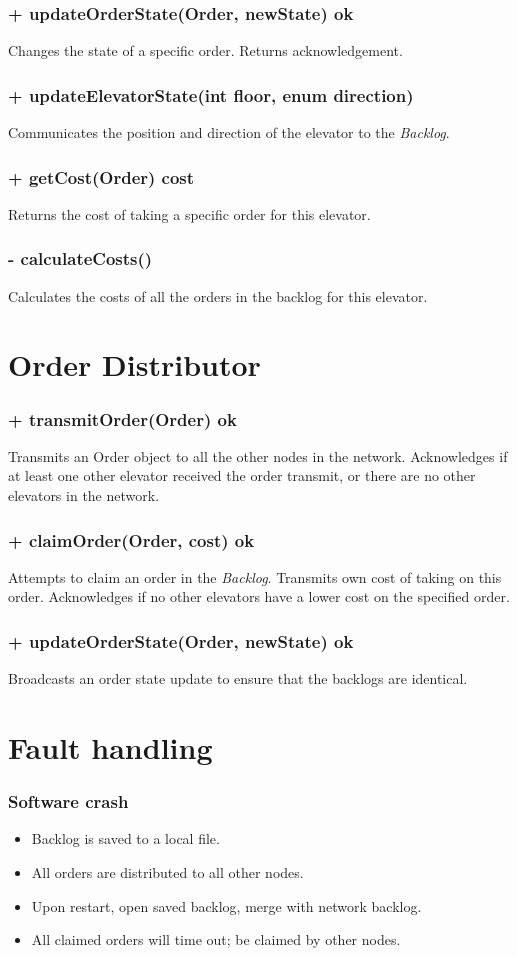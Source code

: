\documentclass[11pt,a4paper]{article}
\begin{document}
\subsubsection*{+ updateOrderState(Order, newState) ok}
Changes the state of a specific order. Returns acknowledgement.
\subsubsection*{+ updateElevatorState(int floor, enum direction)}
Communicates the position and direction of the elevator to the \textit{Backlog}.
\subsubsection*{+ getCost(Order) cost}
Returns the cost of taking a specific order for this elevator.
\subsubsection*{- calculateCosts()}
Calculates the costs of all the orders in the backlog for this elevator.
\section*{Order Distributor}
\subsubsection*{+ transmitOrder(Order) ok}
Transmits an Order object to all the other nodes in the network. Acknowledges if at least one other elevator received the order transmit, or there are no other elevators in the network.
\subsubsection*{+ claimOrder(Order, cost) ok}
Attempts to claim an order in the \textit{Backlog}. Transmits own cost of taking on this order. Acknowledges if no other elevators have a lower cost on the specified order.
\subsubsection*{+ updateOrderState(Order, newState) ok}
Broadcasts an order state update to ensure that the backlogs are identical.
\clearpage
\section*{Fault handling}
\subsubsection*{Software crash}
\begin{itemize}
\item Backlog is saved to a local file.
\item All orders are distributed to all other nodes.
\item Upon restart, open saved backlog, merge with network backlog.
\item All claimed orders will time out; be claimed by other nodes.
\end{itemize}
\end{document}
